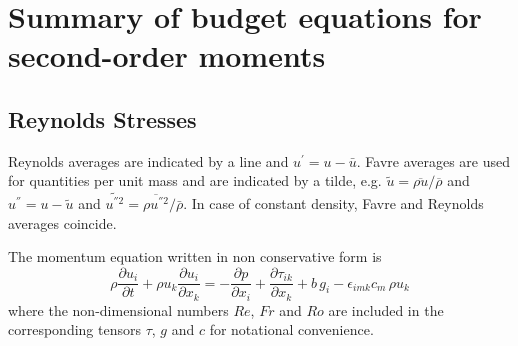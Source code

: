 \section{Summary of budget equations for second-order moments}

\subsection{Reynolds Stresses}

Reynolds averages are indicated by a line and $u^{'}=u-\bar{u}$.  Favre averages
are used for quantities per unit mass and are indicated by a tilde,
e.g. $\tilde{u}=\overline{\rho u}/\overline{\rho}$ and $u^{''}=u-\tilde{u}$ and
$\widetilde{u^{''2}}=\overline{\rho u^{''2}}/\bar{\rho}$. In case of constant
density, Favre and Reynolds averages coincide.

The momentum equation written in non conservative form is
\begin{equation}
\rho \frac{\partial u_i}{\partial t} + \rho u_k \frac{\partial u_i}{\partial
  x_k} = -\frac{\partial p}{\partial x_i} + \frac{\partial \tau_{ik}}{\partial
  x_k} + b\,g_i - \epsilon_{imk} c_m\,\rho u_k
\end{equation}
where the non-dimensional numbers $Re$, $Fr$ and $Ro$ are included in the
corresponding tensors $\tau$, $g$ and $c$ for notational convenience.

